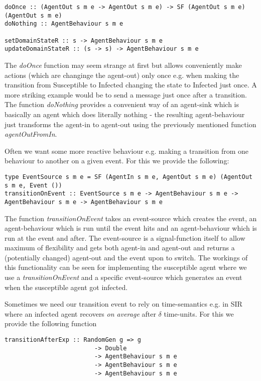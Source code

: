 \begin{verbatim}
doOnce :: (AgentOut s m e -> AgentOut s m e) -> SF (AgentOut s m e) (AgentOut s m e)
doNothing :: AgentBehaviour s m e

setDomainStateR :: s -> AgentBehaviour s m e
updateDomainStateR :: (s -> s) -> AgentBehaviour s m e
\end{verbatim}

The \textit{doOnce} function may seem strange at first but allows conveniently make actions (which are changinge the agent-out) only once e.g. when making the transition from Susceptible to Infected changing the state to Infected just once. A more striking example would be to send a message just once after a transition. The function \textit{doNothing} provides a convenient way of an agent-sink which is basically an agent which does literally nothing - the resulting agent-behaviour just transforms the agent-in to agent-out using the previously mentioned function \textit{agentOutFromIn}.

Often we want some more reactive behaviour e.g. making a transition from one behaviour to another on a given event. For this we provide the following:

\begin{verbatim}
type EventSource s m e = SF (AgentIn s m e, AgentOut s m e) (AgentOut s m e, Event ())
transitionOnEvent :: EventSource s m e -> AgentBehaviour s m e -> AgentBehaviour s m e -> AgentBehaviour s m e
\end{verbatim}

The function \textit{transitionOnEvent} takes an event-source which creates the event, an agent-behaviour which is run until the event hits and an agent-behaviour which is run at the event and after. The event-source is a signal-function itself to allow maximum of flexibility and gets both agent-in and agent-out and returns a (potentially changed) agent-out and the event upon to switch. 
The workings of this functionality can be seen for implementing the susceptible agent where we use a \textit{transitionOnEvent} and a specific event-source which generates an event when the susceptible agent got infected.

Sometimes we need our transition event to rely on time-semantics e.g. in SIR where an infected agent recovers \textit{on average} after $\delta$ time-units. For this we provide the following function

\begin{verbatim}
transitionAfterExp :: RandomGen g => g
						 -> Double 
						 -> AgentBehaviour s m e 
						 -> AgentBehaviour s m e 
						 -> AgentBehaviour s m e
\end{verbatim}

